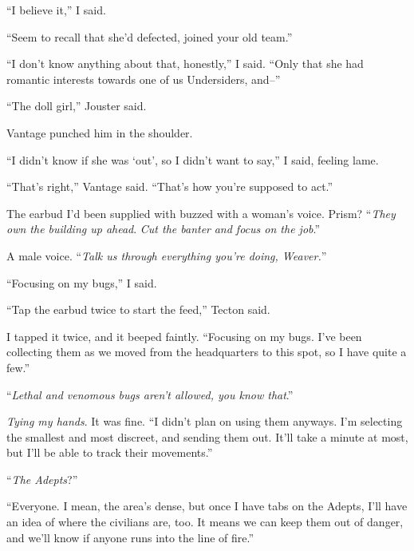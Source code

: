 ``I believe it,'' I said.



``Seem to recall that she'd defected, joined your old team.''



``I don't know anything about that, honestly,'' I said.  ``Only that she had romantic interests towards one of us Undersiders, and--''



``The doll girl,'' Jouster said.



Vantage punched him in the shoulder.



``I didn't know if she was `out', so I didn't want to say,'' I said, feeling lame.



``That's right,'' Vantage said.  ``That's how you're supposed to act.''



The earbud I'd been supplied with buzzed with a woman's voice.  Prism?  ``\emph{They own the building up ahead}.  \emph{Cut the banter }\emph{and focus on the job}.''



A male voice.  ``\emph{Talk us through everything you're doing, Weaver.}''



``Focusing on my bugs,'' I said.



``Tap the earbud twice to start the feed,'' Tecton said.



I tapped it twice, and it beeped faintly.  ``Focusing on my bugs.  I've been collecting them as we moved from the headquarters to this spot, so I have quite a few.''



``\emph{Lethal and venomous bugs aren't allowed, you know that}.''



\emph{Tying my hands}.  It was fine.  ``I didn't plan on using them anyways.  I'm selecting the smallest and most discreet, and sending them out.  It'll take a minute at most, but I'll be able to track their movements.''



``\emph{The Adepts}?''



``Everyone.  I mean, the area's dense, but once I have tabs on the Adepts, I'll have an idea of where the civilians are, too.  It means we can keep them out of danger, and we'll know if anyone runs into the line of fire.''



